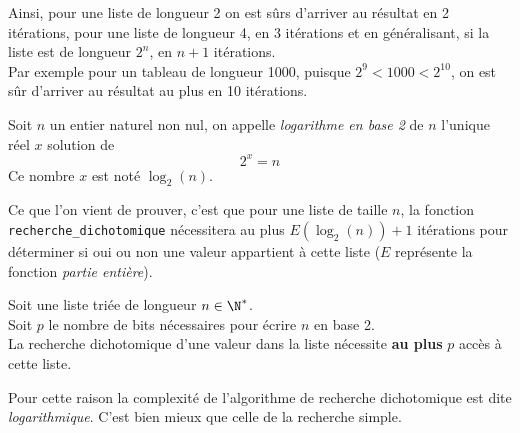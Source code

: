 Ainsi, pour une liste de longueur 2 on est sûrs d'arriver au résultat en 2 itérations, pour une liste de longueur 4, en 3 itérations et en généralisant, si la liste est de longueur $2^n$, en $n+1$ itérations.\\

Par exemple pour un tableau de longueur 1000, puisque $2^9<1000<2^{10}$, on est sûr d'arriver au résultat au plus en 10 itérations.\\

\begin{definition}[]
	Soit $n$ un entier naturel non nul, on appelle \textit{logarithme en base 2} de $n$ l'unique réel $x$ solution de $$2^x=n$$
	Ce nombre $x$ est noté $\log_2(n)$.

\end{definition}

Ce que l'on vient de prouver, c'est que pour une liste de taille $n$, la fonction\\
\texttt{recherche_dichotomique} nécessitera au plus $E(\log_2(n))+1$ itérations pour déterminer si oui ou non une valeur appartient à cette liste ($E$ représente la fonction \textit{partie entière}).\\

\begin{propriete}
	Soit une liste triée de longueur $n\in\N^*$.\\
	Soit $p$ le nombre de bits nécessaires pour écrire $n$ en base 2.\\

	La recherche dichotomique d'une valeur dans la liste nécessite \textbf{au plus} $p$ accès à cette liste.
\end{propriete}

Pour cette raison la complexité de l'algorithme de recherche dichotomique est dite \textit{logarithmique}. C'est bien mieux que celle de la recherche simple.
